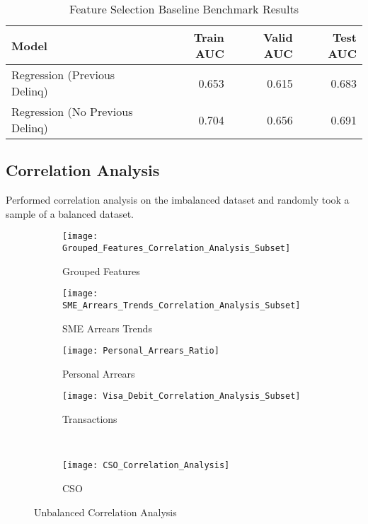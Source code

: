 \begin{table}[H]
	\centering
		\begin{tabular}{l | r | r| r}
			\hline
			\textbf{Model} & \textbf{Train AUC} & \textbf{Valid AUC} &  \textbf{Test AUC} \\
			\hline
			Regression (Previous Delinq) & 0.653 & 0.615 & 0.683  \\
			Regression (No Previous Delinq) & 0.704 & 0.656 & 0.691  \\
			\hline
		\end{tabular}
	\caption{Feature Selection Baseline Benchmark Results}
	\label{table:featureselection_base_model}
\end{table}

\subsection{Correlation Analysis}

Performed correlation analysis on the imbalanced dataset and randomly took a sample of a balanced dataset.

\begin{figure}[H]
	\centering
		\begin{subfigure}[b]{0.32\textwidth}
			\captionsetup{font=scriptsize}
			\texttt{[image: Grouped\_Features\_Correlation\_Analysis\_Subset]}\caption{Grouped Features}\label{fig:groupedFeaturesCorrelation}
		\end{subfigure} 
		\begin{subfigure}[b]{0.32\textwidth}
			\captionsetup{font=scriptsize}
			\texttt{[image: SME\_Arrears\_Trends\_Correlation\_Analysis\_Subset]}
			\caption{SME Arrears Trends}\label{fig:smeArrearsCorrelation}
		\end{subfigure} 
		\begin{subfigure}[b]{0.32\textwidth}
			\captionsetup{font=scriptsize}
			\texttt{[image: Personal\_Arrears\_Ratio]}
			\caption{Personal Arrears}\label{fig:personalArrearsCorrelation}
		\end{subfigure} 
	\medskip
	\begin{subfigure}[b]{0.32\textwidth}
		\captionsetup{font=scriptsize}
		\texttt{[image: Visa\_Debit\_Correlation\_Analysis\_Subset]}
		\caption{Transactions}\label{fig:transVisaCorrelation}
	\end{subfigure} ~\quad
	\begin{subfigure}[b]{0.32\textwidth}
		\captionsetup{font=scriptsize}
		\texttt{[image: CSO\_Correlation\_Analysis]}
		\caption{CSO}\label{fig:CSOCorrelation}
	\end{subfigure}
\caption{Unbalanced Correlation Analysis}
\label{fig:unbal_corr_analysis}
\end{figure}
	
